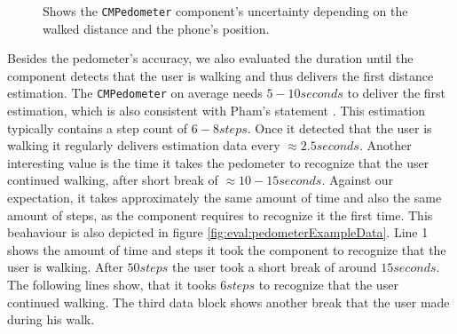 \begin{figure}
  \caption {Shows the \texttt{CMPedometer} component's uncertainty depending on the walked distance and the phone's position.}
  \label{fig:eval:pedometerNDF}
\end{figure}


Besides the pedometer's accuracy, we also evaluated the duration until the component detects that the user is walking and thus delivers the first distance estimation.
The \texttt{CMPedometer} on average needs $5 - 10 seconds$ to deliver the first estimation, which is also consistent with Pham's statement \cite{apple:wwdc_2014_pham}.
This estimation typically contains a step count of $6 - 8 steps$. Once it detected that the user is walking it regularly delivers estimation data every $\approx 2.5 seconds$.
Another interesting value is the time it takes the pedometer to recognize that the user continued walking, after short break of $\approx 10 - 15 seconds$.
Against our expectation, it takes approximately the same amount of time and also the same amount of steps, as the component requires to recognize it the first time.
This beahaviour is also depicted in figure \ref{fig:eval:pedometerExampleData}.
Line 1 shows the amount of time and steps it took the component to recognize that the user is walking.
After $50 steps$ the user took a short break of around $15 seconds$. The following lines show, that it tooks $6steps$ to recognize that the user continued walking.
The third data block shows another break that the user made during his walk.

